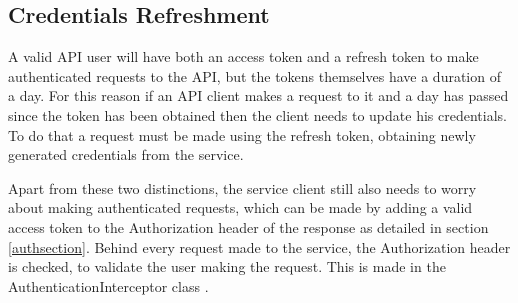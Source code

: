    \subsection{Credentials Refreshment}
    A valid API user will have both an access token and a refresh token to make authenticated requests to the API, but the tokens themselves have a duration of a day.
    For this reason if an API client makes a request to it and a day has passed since the token has been obtained then the client needs to update his credentials.
    To do that a request must be made using the refresh token, obtaining newly generated credentials from the service.

    Apart from these two distinctions, the service client still also needs to worry about making authenticated requests, which can be made by adding a valid
    access token to the Authorization header of the response as detailed in section \ref{authsection}.
    Behind every request made to the service, the Authorization header is checked, to validate the user making the request. This is made in the AuthenticationInterceptor 
    class \cite{authinterceptor}. 

   
